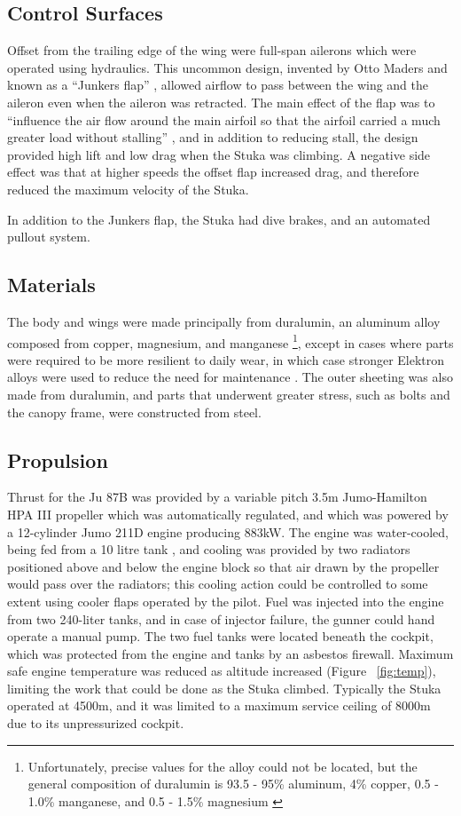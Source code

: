 \documentclass[a4paper, fontsize=11pt]{scrartcl} %
\begin{document}
\subsection{Control Surfaces}
Offset from the trailing edge of the wing were
full-span ailerons which were operated using hydraulics. This uncommon design,
invented by Otto Maders and known as a ``Junkers flap'' \autocite{}, allowed airflow to pass
between the wing and the aileron even when the aileron was retracted.
The main effect of the flap was to ``influence the air flow around the main airfoil so
that the airfoil carried a much greater load without stalling''
\autocite[p~.14]{wenzinger38}, and in addition to reducing stall, the design
provided high lift and low drag when the Stuka was climbing. A negative
side effect was that at higher speeds the offset flap increased drag,
and therefore reduced the maximum velocity of the Stuka.

In addition to the Junkers flap, the Stuka had dive brakes, and an
automated pullout system.

\subsection{Materials}

The body and wings were made principally from
duralumin, an aluminum alloy composed from copper, magnesium, and
manganese
\footnote{Unfortunately, precise values for the alloy could not
  be located, but the general composition of duralumin is 93.5 - 95\% aluminum, 4\%
  copper, 0.5 - 1.0\% manganese, and 0.5 - 1.5\%
  magnesium \autocite[p.~102-103]{wardlaw33}
}, except in cases where parts were required to be more resilient to daily
wear, in which case stronger Elektron alloys were used to reduce the
need for maintenance \autocite[p.~15]{guardia14}. The outer sheeting was
also made from duralumin, and parts that underwent greater stress, such
as bolts and the canopy frame, were constructed from steel.

\subsection{Propulsion}
Thrust for the Ju 87B was provided by a variable pitch 3.5m
Jumo-Hamilton HPA III propeller which was automatically regulated, and
which was powered by a 12-cylinder Jumo 211D engine producing 883kW. The engine
was water-cooled, being fed from a 10 litre tank
\autocite[p~.7]{manual41}, and cooling was provided by two radiators
positioned above and below the engine block so that air drawn by the
propeller would pass over the radiators; this cooling action could be
controlled to some extent using cooler flaps operated by the pilot. Fuel
was injected into the engine from two 240-liter tanks, and in case of
injector failure, the gunner could hand operate a manual pump. The two
fuel tanks were located beneath the cockpit, which was protected from
the engine and tanks by an asbestos firewall. Maximum safe engine temperature
was reduced as altitude increased (Figure ~\ref{fig:temp}), limiting the
work that could be done as the Stuka climbed. Typically the Stuka
operated at 4500m, and it was limited to a maximum service ceiling of
8000m due to its unpressurized cockpit.
\end{document}
